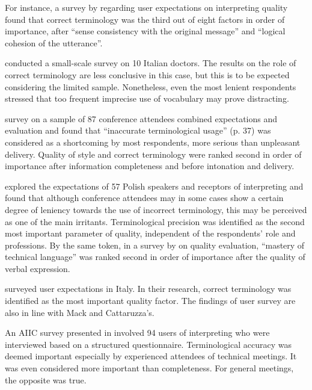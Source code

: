 For instance, a survey by \citet{kurz_conference_1989,kurz_conference_1993} regarding user expectations on interpreting quality found that correct terminology was the third out of eight factors in order of importance, after ``sense consistency with the original message'' and ``logical cohesion of the utterance''.

\citet{meak_interpretation_1990} conducted a small-scale survey on 10 Italian doctors. The results on the role of correct terminology are less conclusive in this case, but this is to be expected considering the limited sample. Nonetheless, even the most lenient respondents stressed that too frequent imprecise use of vocabulary may prove distracting.

 survey on a sample of 87 conference attendees combined expectations and evaluation and found that ``inaccurate terminological usage'' (p. 37) was considered as a shortcoming by most respondents, more serious than unpleasant delivery. Quality of style and correct terminology were ranked second in order of importance after information completeness and before intonation and delivery.

\citet{kopczynski1994quality} explored the expectations of 57 Polish speakers and receptors of interpreting and found that although conference attendees may in some cases show a certain degree of leniency towards the use of incorrect terminology, this may be perceived as one of the main irritants. Terminological precision was identified as the second most important parameter of quality, independent of the respondents' role and professions. By the same token, in a survey by \citet{pochhacker_simultandolmetschen_1994} on quality evaluation, ``mastery of technical language'' was ranked second in order of importance after the quality of verbal expression.

\citet{mack_user_1995} surveyed user expectations in Italy. In their research, correct terminology was identified as the most important quality factor. The findings of  user survey are also in line with Mack and Cattaruzza's.

An AIIC survey presented in \citet{moser_survey_1995,moser_expectations_1996} involved 94 users of interpreting who were interviewed based on a structured questionnaire. Terminological accuracy was deemed important especially by experienced attendees of technical meetings. It was even considered more important than completeness. For general meetings, the opposite was true.

